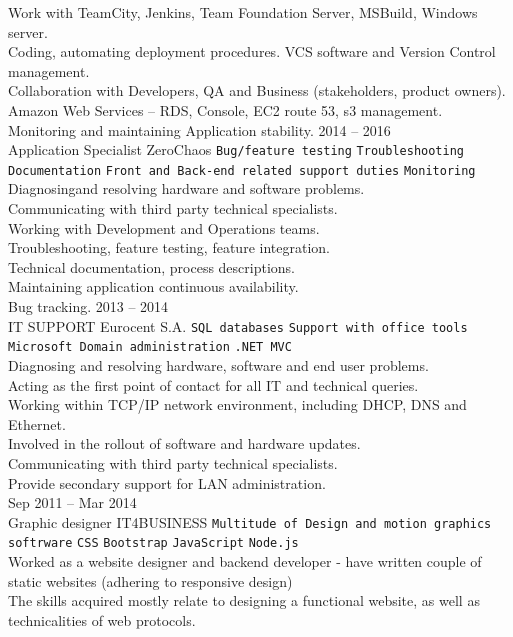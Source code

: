 \documentclass[9pt]{style/developercv}
\begin{document}
\begin{entrylist}
{			Work with TeamCity, Jenkins, Team Foundation Server, MSBuild, Windows server.\\
			Coding, automating deployment procedures. VCS software and Version Control management.\\
			Collaboration with Developers, QA and Business (stakeholders, product owners).\\
			Amazon Web Services – RDS, Console, EC2 route 53, s3 management.\\
			Monitoring and maintaining Application stability.
		}
	\entry
		{2014 -- 2016\\\footnotesize{Application Specialist}}
		{ZeroChaos}
		{
			\texttt{Bug/feature testing}\slashsep
			\texttt{Troubleshooting}\slashsep
			\texttt{Documentation}\slashsep
			\texttt{Front and Back-end related support duties}\slashsep
			\texttt{Monitoring}\\

			
			Diagnosingand resolving hardware and software problems. \\
			Communicating with third party technical specialists. \\
			Working with Development and Operations teams. \\
			Troubleshooting, feature testing, feature integration. \\
			Technical documentation, process descriptions. \\
			Maintaining application continuous availability. \\
			Bug tracking.
		}
	\entry
		{2013 -- 2014\\\footnotesize{IT SUPPORT}}
		{Eurocent S.A.}
		{
			\texttt{SQL databases}\slashsep
			\texttt{Support with office tools}\slashsep
			\texttt{Microsoft Domain administration}\slashsep
			\texttt{.NET MVC}\\

			Diagnosing and resolving hardware, software and end user problems. \\
			Acting as the first point of contact for all IT and technical queries. \\
			Working within TCP/IP network environment, including DHCP, DNS and Ethernet. \\
			Involved in the rollout of software and hardware updates. \\
			Communicating with third party technical specialists. \\
			Provide secondary support for LAN administration. \\
		}
	\entry
		{Sep 2011 -- Mar 2014\\\footnotesize{Graphic designer}}
		{IT4BUSINESS}
		{
			\texttt{Multitude of Design and motion graphics softrware}\slashsep
			\texttt{CSS}\slashsep
			\texttt{Bootstrap}\slashsep
			\texttt{JavaScript}\slashsep
			\texttt{Node.js}\\

			Worked as a website designer and backend developer - have written 
			couple of static websites (adhering to responsive design)\\
			The skills acquired mostly relate to designing a functional website, as 
			well as technicalities of web protocols.
		}
\end{entrylist}
\end{document}
